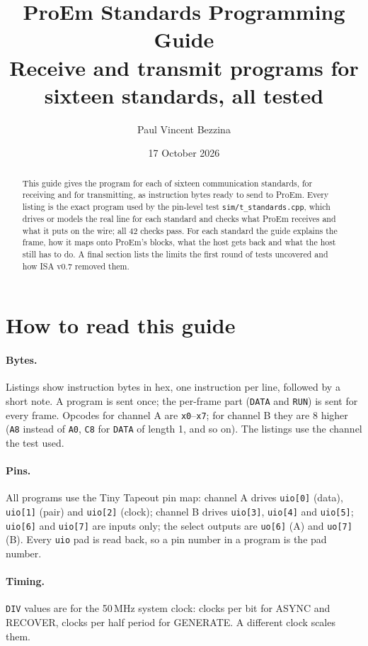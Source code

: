 \documentclass[11pt,a4paper]{article}
\title{ProEm Standards Programming Guide\\\large Receive and transmit programs for sixteen standards, all tested}
\author{Paul Vincent Bezzina}
\date{17 October 2026}
\newcommand{\sig}[1]{\texttt{#1}}
\begin{document}
\maketitle
\thispagestyle{fancy}

\begin{abstract}
This guide gives the program for each of sixteen communication standards, for receiving and for transmitting, as instruction bytes ready to send to ProEm. Every listing is the exact program used by the pin-level test \sig{sim/t\_standards.cpp}, which drives or models the real line for each standard and checks what ProEm receives and what it puts on the wire; all 42 checks pass. For each standard the guide explains the frame, how it maps onto ProEm's blocks, what the host gets back and what the host still has to do. A final section lists the limits the first round of tests uncovered and how ISA v0.7 removed them.
\end{abstract}

\tableofcontents
\newpage

\section{How to read this guide}

\paragraph{Bytes.} Listings show instruction bytes in hex, one instruction per line, followed by a short note. A program is sent once; the per-frame part (\sig{DATA} and \sig{RUN}) is sent for every frame. Opcodes for channel A are \texttt{x0}--\texttt{x7}; for channel B they are 8 higher (\texttt{A8} instead of \texttt{A0}, \texttt{C8} for \sig{DATA} of length 1, and so on). The listings use the channel the test used.

\paragraph{Pins.} All programs use the Tiny Tapeout pin map: channel A drives \sig{uio[0]} (data), \sig{uio[1]} (pair) and \sig{uio[2]} (clock); channel B drives \sig{uio[3]}, \sig{uio[4]} and \sig{uio[5]}; \sig{uio[6]} and \sig{uio[7]} are inputs only; the select outputs are \sig{uo[6]} (A) and \sig{uo[7]} (B). Every \sig{uio} pad is read back, so a pin number in a program is the pad number.

\paragraph{Timing.} \sig{DIV} values are for the 50\,MHz system clock: clocks per bit for ASYNC and RECOVER, clocks per half period for GENERATE. A different clock scales them.
\end{document}
